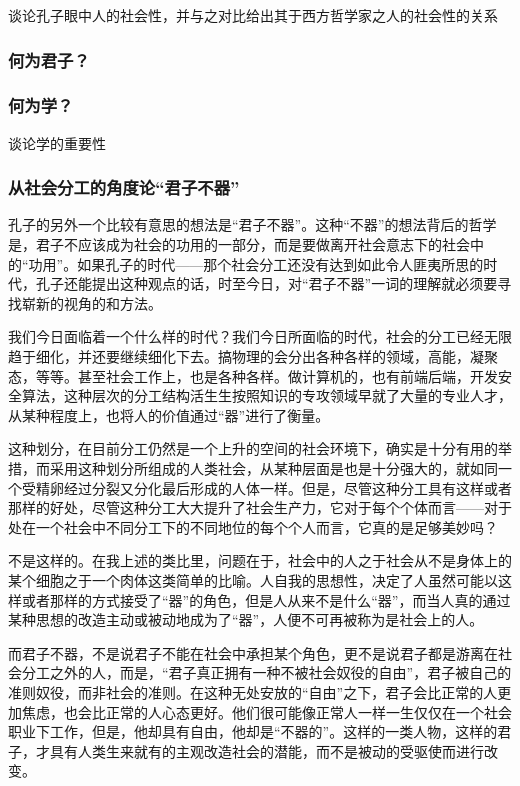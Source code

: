 \documentclass[10pt,a4paper]{article}
\begin{document}
谈论孔子眼中人的社会性，并与之对比给出其于西方哲学家之人的社会性的关系
\subsubsection{何为君子？}
\label{sec:orgf1ec9b0}
\subsubsection{何为学？}
\label{sec:org008478e}
谈论学的重要性
\subsubsection{从社会分工的角度论“君子不器”}
\label{sec:org02042cd}
孔子的另外一个比较有意思的想法是“君子不器”。这种“不器”的想法背后的哲学是，君子不应该成为社会的功用的一部分，而是要做离开社会意志下的社会中的“功用”。如果孔子的时代——那个社会分工还没有达到如此令人匪夷所思的时代，孔子还能提出这种观点的话，时至今日，对“君子不器”一词的理解就必须要寻找崭新的视角的和方法。

我们今日面临着一个什么样的时代？我们今日所面临的时代，社会的分工已经无限趋于细化，并还要继续细化下去。搞物理的会分出各种各样的领域，高能，凝聚态，等等。甚至社会工作上，也是各种各样。做计算机的，也有前端后端，开发安全算法，这种层次的分工结构活生生按照知识的专攻领域早就了大量的专业人才，从某种程度上，也将人的价值通过“器”进行了衡量。

这种划分，在目前分工仍然是一个上升的空间的社会环境下，确实是十分有用的举措，而采用这种划分所组成的人类社会，从某种层面是也是十分强大的，就如同一个受精卵经过分裂又分化最后形成的人体一样。但是，尽管这种分工具有这样或者那样的好处，尽管这种分工大大提升了社会生产力，它对于每个个体而言——对于处在一个社会中不同分工下的不同地位的每个个人而言，它真的是足够美妙吗？

不是这样的。在我上述的类比里，问题在于，社会中的人之于社会从不是身体上的某个细胞之于一个肉体这类简单的比喻。人自我的思想性，决定了人虽然可能以这样或者那样的方式接受了“器”的角色，但是人从来不是什么“器”，而当人真的通过某种思想的改造主动或被动地成为了“器”，人便不可再被称为是社会上的人。

而君子不器，不是说君子不能在社会中承担某个角色，更不是说君子都是游离在社会分工之外的人，而是，“君子真正拥有一种不被社会奴役的自由”，君子被自己的准则奴役，而非社会的准则。在这种无处安放的“自由”之下，君子会比正常的人更加焦虑，也会比正常的人心态更好。他们很可能像正常人一样一生仅仅在一个社会职业下工作，但是，他却具有自由，他却是“不器的”。这样的一类人物，这样的君子，才具有人类生来就有的主观改造社会的潜能，而不是被动的受驱使而进行改变。
\end{document}

